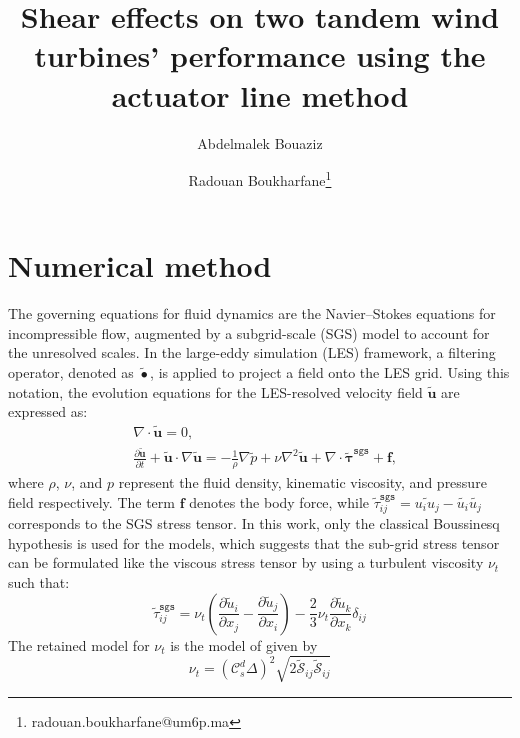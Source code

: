 \documentclass[11pt,a4paper]{article}
\title{Shear effects on two tandem wind turbines' performance using the actuator line method}
\author[1]{Abdelmalek Bouaziz}
\author[1]{Radouan Boukharfane\thanks{radouan.boukharfane@um6p.ma}}
\affil[1]{College of Computing, Mohammed VI Polytechnic University (UM6P), Benguerir, Morocco}
\date{}
\begin{document}
\maketitle

\section{Numerical method}

The governing equations for fluid dynamics are the Navier–Stokes equations for incompressible flow, augmented by a subgrid-scale (SGS) model to account for the unresolved scales. In the large-eddy simulation (LES) framework, a filtering operator, denoted as $\widetilde{\bullet}$, is applied to project a field onto the LES grid. 
%
Using this notation, the evolution equations for the LES-resolved velocity field $\widetilde{\boldsymbol{u}}$ are expressed as:
%
%
\begin{align}
&\nabla \cdot \widetilde{\boldsymbol{u}} = 0, \label{eq:mass_conservation} \\
&\frac{\partial \widetilde{\boldsymbol{u}}}{\partial t} + \widetilde{\boldsymbol{u}} \cdot \nabla \widetilde{\boldsymbol{u}} = 
-\frac{1}{\rho} \nabla \widetilde{p} + \nu \nabla^2 \widetilde{\boldsymbol{u}} 
+ \nabla \cdot \widetilde{\boldsymbol{\tau}}^{\texttt{sgs}} + \boldsymbol{f}, \label{eq:momentum_conservation}
\end{align}
%
where $\rho$, $\nu$, and $p$ represent the fluid density, kinematic viscosity, and pressure field respectively. The term $\boldsymbol{f}$ denotes the body force, while $\widetilde{\tau}_{ij}^{\texttt{sgs}}=\widetilde{u_iu_j}-\widetilde{u_i}\widetilde{u_j}$ corresponds to the SGS stress tensor.
%
In this work, only the classical Boussinesq hypothesis \citep{boussinesq1877essai} is used for the models, which suggests that the sub-grid stress tensor can be formulated like the viscous stress tensor by using a turbulent viscosity $\nu_t$ such that:
\begin{equation}
\widetilde{\tau}_{ij}^{\texttt{sgs}}=\nu_t\left(\frac{\partial\widetilde{u}_i}{\partial x_j}-\frac{\partial\widetilde{u}_j}{\partial x_i}\right)-\frac23\nu_t\frac{\partial\widetilde{u}_k}{\partial x_k}\delta_{ij}
\end{equation}
%
The retained model for $\nu_t$ is the model of \citet{germano1991dynamic} given by 
\begin{equation}
\nu_t = \left(\mathcal{C}^d_s\Delta\right)^2\sqrt{2\widetilde{\mathcal{S}}_{ij}\widetilde{\mathcal{S}}_{ij}}
\end{equation}
\end{document}
